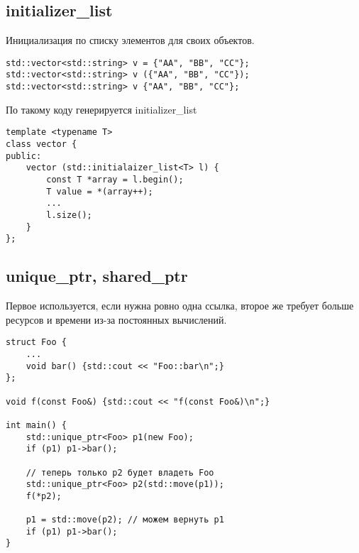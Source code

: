 \subsection{initializer\_list}
Инициализация по списку элементов для своих объектов.
\begin{verbatim}
std::vector<std::string> v = {"AA", "BB", "CC"};
std::vector<std::string> v ({"AA", "BB", "CC"});
std::vector<std::string> v {"AA", "BB", "CC"};
\end{verbatim}
По такому коду генерируется initializer\_list
\begin{verbatim}
template <typename T>
class vector {
public:
	vector (std::initialaizer_list<T> l) {
	    const T *array = l.begin();
		T value = *(array++);
		...
		l.size();
	}
};
\end{verbatim}
\subsection{unique\_ptr, shared\_ptr}
Первое используется, если нужна ровно одна ссылка, второе же требует больше ресурсов и времени из-за постоянных вычислений.
\begin{verbatim}
struct Foo {
    ...
	void bar() {std::cout << "Foo::bar\n";}
};

void f(const Foo&) {std::cout << "f(const Foo&)\n";} 

int main() {
	std::unique_ptr<Foo> p1(new Foo); 
	if (p1) p1->bar();

	// теперь только p2 будет владеть Foo
	std::unique_ptr<Foo> p2(std::move(p1));
	f(*p2);

	p1 = std::move(p2); // можем вернуть p1
	if (p1) p1->bar();
}
\end{verbatim}

